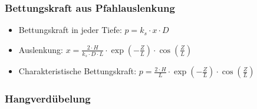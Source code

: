\documentclass[fleqn,twoside]{article}
\begin{document}
\subsubsection{Bettungskraft aus Pfahlauslenkung}
\begin{itemize}
    \item Bettungskraft in jeder Tiefe: $p=k_s \cdot x \cdot D$
    \item Auslenkung: $x= \frac{2\cdot H}{k_s \cdot D \cdot L} \cdot \exp(-\frac{Z}{L})\cdot\cos(\frac{Z}{L})$
    \item Charakteristische Bettungskraft: $p=\frac{2\cdot H}{L} \cdot \exp(-\frac{Z}{L}) \cdot \cos(\frac{Z}{L})$
\end{itemize}

\subsubsection{Hangverdübelung}
\end{document}
